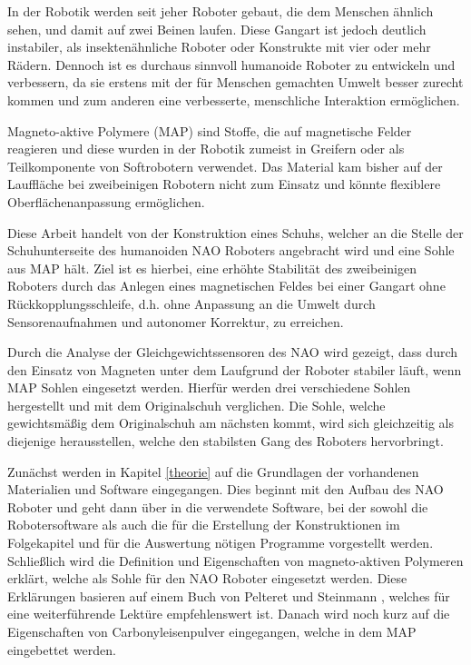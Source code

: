 In der Robotik werden seit jeher Roboter gebaut, die dem Menschen ähnlich sehen, und damit auf zwei Beinen laufen. Diese Gangart ist jedoch deutlich instabiler, als insektenähnliche Roboter oder Konstrukte mit vier oder mehr Rädern. Dennoch ist es durchaus sinnvoll humanoide Roboter zu entwickeln und verbessern, da sie erstens mit der für Menschen gemachten Umwelt besser zurecht kommen und zum anderen eine verbesserte, menschliche Interaktion ermöglichen. 

Magneto-aktive Polymere (MAP) sind Stoffe, die auf magnetische Felder reagieren und diese wurden in der Robotik zumeist in Greifern oder als Teilkomponente von Softrobotern verwendet. Das Material kam bisher auf der Lauffläche bei zweibeinigen Robotern nicht zum Einsatz und könnte flexiblere Oberflächenanpassung ermöglichen. 

Diese Arbeit handelt von der Konstruktion eines Schuhs, welcher an die Stelle der Schuhunterseite des humanoiden NAO Roboters angebracht wird und eine Sohle aus MAP hält. Ziel ist es hierbei, eine erhöhte Stabilität des zweibeinigen Roboters durch das Anlegen eines magnetischen Feldes bei einer Gangart ohne Rückkopplungsschleife, d.h. ohne Anpassung an die Umwelt durch Sensorenaufnahmen und autonomer Korrektur, zu erreichen. 

Durch die Analyse der Gleichgewichtssensoren des NAO wird gezeigt, dass durch den Einsatz von Magneten unter dem Laufgrund der Roboter stabiler läuft, wenn MAP Sohlen eingesetzt werden. Hierfür werden drei verschiedene Sohlen hergestellt und mit dem Originalschuh verglichen. Die Sohle, welche gewichtsmäßig dem Originalschuh am nächsten kommt, wird sich gleichzeitig als diejenige herausstellen, welche den stabilsten Gang des Roboters hervorbringt. 

Zunächst werden in Kapitel \ref{theorie} auf die Grundlagen der vorhandenen Materialien und Software eingegangen. Dies beginnt mit den Aufbau des NAO Roboter und geht dann über in die verwendete Software, bei der sowohl die Robotersoftware als auch die für die Erstellung der Konstruktionen im Folgekapitel und für die Auswertung nötigen Programme vorgestellt werden. Schließlich wird die Definition und Eigenschaften von magneto-aktiven Polymeren erklärt, welche als Sohle für den NAO Roboter eingesetzt werden. Diese Erklärungen basieren auf einem Buch von Pelteret und Steinmann \cite{map2020}, welches für eine weiterführende Lektüre empfehlenswert ist. Danach wird noch kurz auf die Eigenschaften von Carbonyleisenpulver eingegangen, welche in dem MAP eingebettet werden.

